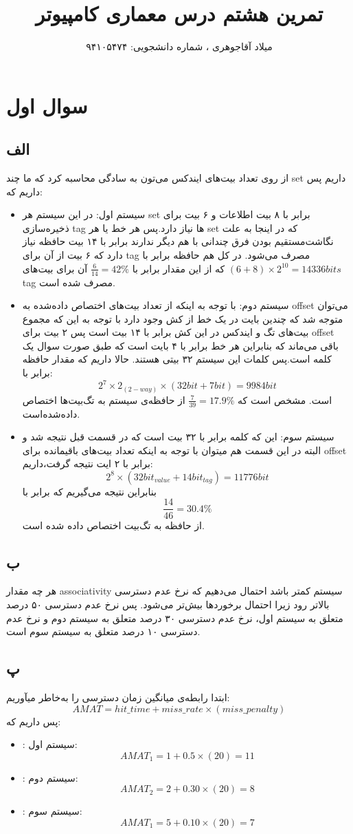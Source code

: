 \documentclass[11pt]{article}
\title{تمرین هشتم درس معماری کامپیوتر}
\author{میلاد آقاجوهری ، شماره دانشجویی: ۹۴۱۰۵۴۷۴}
\begin{document}
\maketitle
\section{سوال اول}
\subsection{الف}
از روی تعداد بیت‌های ایندکس می‌تون به سادگی  محاسبه کرد که ما چند set داریم پس داریم که:
\begin{itemize}
\item سیستم اول:
در این سیستم هر set برابر با ۸ بیت اطلاعات و ۶ بیت برای ذخیره‌سازی tag ها نیاز دارد.پس هر خط یا هر set که در اینجا به علت نگاشت‌مستقیم بودن فرق چندانی با هم دیگر ندارند برابر با ۱۴ بیت حافظه نیاز دارد که ۶ بیت از آن برای tag مصرف می‌شود. در کل هم حافظه برابر با 
$(6+8)\times 2^{10} = 14336 bits$
که از این مقدار برابر با 
$\frac{6}{14} = 42\%$
آن برای بیت‌های tag مصرف شده است.
\item سیستم دوم:
با توجه به اینکه از تعداد بیت‌های اختصاص داده‌شده به offset می‌توان متوجه‌ شد که چندین بایت در یک خط از کش وجود دارد با توجه به این که مجموع بیت‌های تگ و ایندکس در این کش برابر با ۱۴ بیت است پس ۲ بیت برای offset باقی می‌ماند که بنابراین هر خط برابر با ۴ بایت است که طبق صورت سوال یک کلمه است.پس کلمات این سیستم ۳۲ بیتی هستند. حالا داریم که مقدار حافظه برابر با:
$$2^{7}\times 2_{(2-way)} \times (32bit + 7bit) = 9984bit$$
است.
مشخص است که 
$\frac{7}{39} = 17.9\%$
از حافظه‌‌ی سیستم به تگ‌بیت‌ها اختصاص داده‌شده‌است.
\item سیستم سوم:
این که کلمه برابر با ۳۲ بیت است که در قسمت قبل نتیجه شد و البته در این قسمت هم میتوان با توجه به اینکه تعداد بیت‌‌های باقیمانده برای offset برابر با ۲ ایت نتیجه گرفت،‌داریم:
$$2^8\times (32bit_{value} + 14bit_{tag}) = 11776bit$$
بنابراین نتیجه می‌گیریم که برابر با
$$\frac{14}{46} = 30.4\%$$
از حافظه به تگ‌بیت اختصاص داده شده است.
\end{itemize}
\subsection{ب}
هر چه مقدار associativity سیستم کمتر باشد احتمال می‌دهیم که نرخ عدم دسترسی بالاتر رود زیرا احتمال برخور‌د‌ها بیش‌تر می‌شود. پس نرخ عدم دسترسی ۵۰ درصد متعلق به سیستم اول، نرخ عدم دسترسی ۳۰ درصد متعلق به سیستم دوم و نرخ عدم دسترسی ۱۰ درصد متعلق به سیستم سوم است.
\subsection{پ}
ابتدا رابطه‌ی میانگین زمان دسترسی را به‌خاطر میآوریم:
$$AMAT = hit\_time  + miss\_rate \times (miss\_penalty)$$
پس داریم که:
\begin{itemize}
\item:
سیستم اول:
$$AMAT_{1} = 1  + 0.5 \times (20) = 11$$
\item:
سیستم دوم:
$$AMAT_{2} = 2  + 0.30 \times (20) = 8$$
\item:
سیستم سوم:
$$AMAT_{1} = 5  + 0.10 \times (20) = 7$$


\end{itemize}
\end{document}

